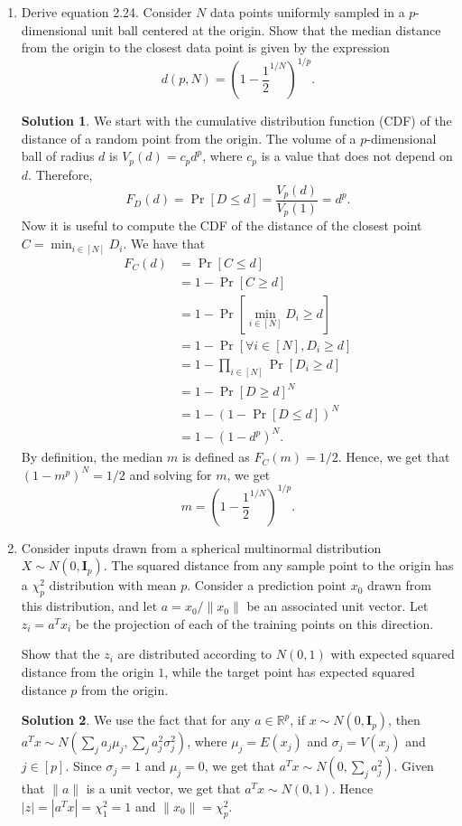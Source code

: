 \documentclass[]{book}
\theoremstyle{definition}
\newtheorem*{soln}{Solution}
\begin{document}
\begin{enumerate}
	\item\label{eq2.24} Derive equation 2.24. Consider $N$ data points uniformly
	sampled in a $p$-dimensional unit ball centered at the origin. Show that the
	median distance from the origin to the closest data point is given by the 
	expression $$d(p,N)=\left(1-\frac{1}{2}^{1/N}\right)^{1/p}.$$
	\begin{soln}
		We start with the cumulative distribution function (CDF) of the distance 
		of a random point from the origin. The volume of a $p$-dimensional ball of 
		radius $d$ is $V_p(d)=c_pd^p$, where $c_p$ is a value that does not depend
		on $d$. Therefore,
		\begin{equation}\tag{First trick to remember}
			F_D(d)=\Pr[D\le d]=\frac{V_p(d)}{V_p(1)}=d^p.
		\end{equation}
		Now it is useful to compute the CDF of the distance of the closest point
		$C=\min_{i\in[N]} D_i$. We have that 
		\begin{equation}
			\begin{split}
				F_C(d) &= \Pr[C\le d] \\
				&= 1-\Pr[C\ge d] \\
				&= 1-\Pr\left[\min_{i\in[N]} D_i \ge d\right] \\
				&= 1-\Pr[\forall i\in[N], D_i \ge d] \\
				&= 1-\prod_{i\in[N]}\Pr[D_i \ge d] \\
				&= 1-\Pr[D \ge d]^N \\
				&= 1-(1-\Pr[D \le d])^N \\
				&= 1-(1-d^p)^N.
			\end{split}
		\end{equation}
		By definition, the median $m$ is defined as $F_C(m)=1/2$. Hence, we get
		that $(1-m^p)^N=1/2$ and solving for $m$, we get
		\[m=\left(1-\frac{1}{2}^{1/N}\right)^{1/p}.\]
	\end{soln}

	\item \label{multi-normal} Consider inputs drawn from a spherical
	multinormal distribution $X\sim N(0,\mathbf{I}_p)$. The squared distance
	from any sample point to the origin has a $\chi_p^2$ distribution with mean
	$p$. Consider a prediction point $x_0$ drawn from this distribution, and let
	$a=x_0/\|x_0\|$ be an associated unit vector. Let $z_i=a^Tx_i$ be the
	projection of each of the training points on this direction.

	Show that the $z_i$ are distributed according to $N(0,1)$ with expected
	squared distance from the origin $1$, while the target point has expected
	squared distance $p$ from the origin.

	\begin{soln}
		We use the fact that for any $a\in\mathbb{R}^p$, if $x\sim
		N(0,\mathbf{I}_p)$, then $a^Tx\sim
		N\left(\sum_ja_j\mu_j,\sum_ja_j^2\sigma_j^2\right)$, where
		$\mu_j=E(x_j)$ and $\sigma_j=V(x_j)$ and $j\in[p]$. Since $\sigma_j=1$
		and $\mu_j=0$, we get that $a^Tx\sim N\left(0,\sum_ja_j^2\right)$. Given
		that $\|a\|$ is a unit vector, we get that $a^Tx\sim N\left(0,1\right)$.
		Hence $|z|=|a^Tx|=\chi_1^2=1$ and $\|x_0\|=\chi_p^2$. 
	\end{soln}

\end{enumerate}
\end{document}

